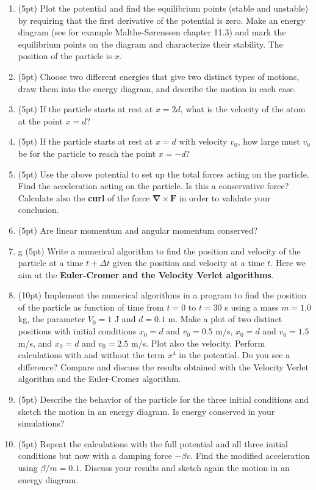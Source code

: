 \documentclass[%
oneside,                 %
final,                   %
10pt]{article}
\begin{document}
\begin{enumerate}
\item (5pt) Plot the potential and find the  equilibrium points (stable and unstable) by requiring that the first derivative of the potential is zero. Make an energy diagram (see for example Malthe-Sørenssen chapter 11.3) and mark the equilibrium points on the diagram and characterize their stability. The position of the particle is $x$. 

\item (5pt) Choose two different energies that give two distinct types of motions, draw them into the energy diagram, and describe the motion in each case.

\item (5pt) If the particle  starts at rest at $x=2d$, what is the velocity of the atom at the point $x=d$?

\item (5pt) If the particle  starts at rest at $x=d$ with velocity $v_0$, how large must $v_0$ be for the  particle to reach the point $x=−d$?

\item (5pt) Use the above potential to set up the total forces acting on the particle.  Find the acceleration acting on the particle. Is this a conservative force? Calculate also the \textbf{curl} of the force  $\bm{\nabla}\times \bm{F}$ in order to validate your conclusion. 

\item (5pt) Are linear momentum and angular momentum conserved? 

\item g (5pt) Write a numerical algorithm to find the position and velocity of the particle at a time $t+\Delta t$ given the position and velocity at a time $t$. Here we aim at the \textbf{Euler-Cromer and the Velocity Verlet algorithms}.   

\item (10pt) Implement the numerical algorithms in a program to find the position of the particle as function of time from $t=0$ to $t=30$ s using a mass  $m=1.0$ kg, the parameter $V_0=1$ J and $d=0.1$ m. Make a plot of two distinct positions with initial conditions $x_0=d$ and $v_0=0.5$ m/s, $x_0=d$ and $v_0=1.5$ m/s, and $x_0=d$ and $v_0=2.5$ m/s. Plot also the velocity.  Perform calculations with and without the term $x^4$ in the potential. Do you see a difference? Compare and discuss the results obtained with the Velocity Verlet algorithm and the Euler-Cromer algorithm. 

\item (5pt) Describe the behavior of the particle for the three initial conditions  and sketch the motion in an energy diagram. Is energy conserved in your simulations?

\item (5pt) Repeat the calculations with the full potential and all three initial conditions but now with a damping force $-\beta v$. Find the modified acceleration using $\beta/m=0.1$. Discuss your results and sketch again the motion in an energy diagram.
\end{enumerate}
\end{document}
